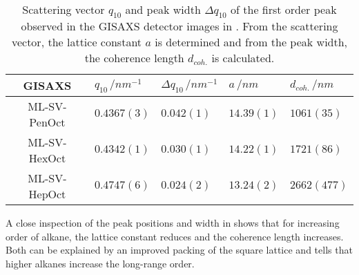 \documentclass[\main/dresen_thesis.tex]{subfiles}
\begin{document}
    \begin{table}[tb]
      \centering
      \caption{\label{tab:monolayers:solventProperties:GisaxsLatticeParams}Scattering vector $q_{10}$ and peak width $\Delta q_{10}$ of the first order peak observed in the GISAXS detector images in . From the scattering vector, the lattice constant $a$ is determined and from the peak width, the coherence length $d_{coh.}$ is calculated.}
      \begin{tabular}{ c | l | l || l | l }
        \textbf{GISAXS}  & $q_{10} \,/ \unit{nm^{-1}}$ & $\Delta q_{10} \, / \unit{nm^{-1}}$ & $a\, / \unit{nm}$ & $d_{coh.}\, / \unit{nm}$ \\
        \hline
        ML-SV-PenOct    & $0.4367(3)$    & $0.042(1)$    & $14.39(1)$    & $1061(35)$\\
        ML-SV-HexOct    & $0.4342(1)$    & $0.030(1)$    & $14.22(1)$    & $1721(86)$\\
        ML-SV-HepOct    & $0.4747(6)$    & $0.024(2)$    & $13.24(2)$    & $2662(477)$\\
        \hline
      \end{tabular}
    \end{table}

    A close inspection of the peak positions and width in  shows that for increasing order of alkane, the lattice constant reduces and the coherence length increases.
    Both can be explained by an improved packing of the square lattice and tells that higher alkanes increase the long-range order.
  \FloatBarrier
\end{document}
